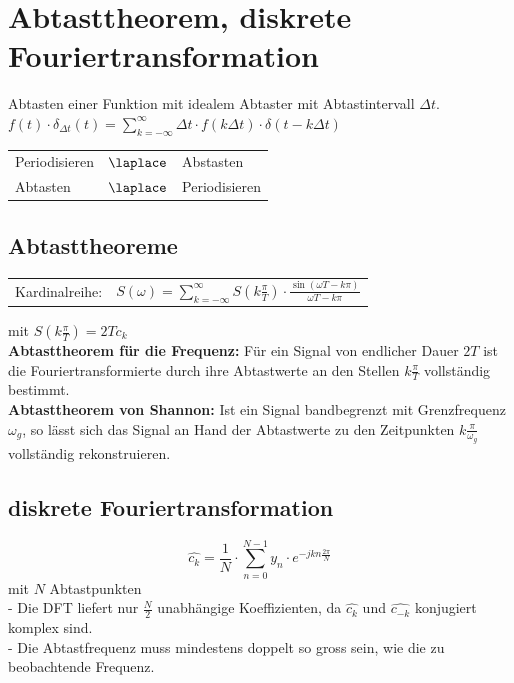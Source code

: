 
\section{Abtasttheorem, diskrete Fouriertransformation}
	\begin{minipage}{12cm}
		Abtasten einer Funktion mit idealem Abtaster mit Abtastintervall $\Delta t$.\\
		$f(t) \cdot \delta_{\Delta t}(t) = \sum\limits_{k=-\infty}^{\infty} \Delta t \cdot f(k \Delta t) \cdot \delta(t-k \Delta t)$
	\end{minipage}
	\begin{minipage}{6cm}
		\begin{tabular}{|l l l|}
			\hline
				Periodisieren &$\laplace$ & Abstasten\\
				Abtasten & $\laplace$ & Periodisieren\\
			\hline
		\end{tabular}
	\end{minipage}

\subsection{Abtasttheoreme}
	\begin{tabular}{ l l }
		Kardinalreihe: & $S(\omega) = \sum\limits_{k=-\infty}^{\infty} S(k\frac{\pi}{T}) \cdot \frac{\sin(\omega T - k\pi)}{\omega T - k\pi}$
	\end{tabular}
	mit $S(k\frac{\pi}{T}) = 2Tc_k$\\
	
	\textbf{Abtasttheorem f\"ur die Frequenz:}
	F\"ur ein Signal von endlicher Dauer $2T$ ist die Fouriertransformierte durch ihre Abtastwerte an den Stellen $k\frac{\pi}{T}$
	vollst\"andig bestimmt. \\
	
	\textbf{Abtasttheorem von Shannon:}
	Ist ein Signal bandbegrenzt mit Grenzfrequenz $\omega_g$, so l\"asst sich das Signal an Hand der Abtastwerte zu den Zeitpunkten
	$k\frac{\pi}{\omega_g}$ vollst\"andig rekonstruieren.
	
	
\subsection{diskrete Fouriertransformation}
	$$\hat{c_k} = \frac{1}{N} \cdot \sum\limits_{n=0}^{N-1} y_n \cdot e^{-jkn\frac{2\pi}{N}}$$
	mit $N$ Abtastpunkten\\
		-	Die DFT liefert nur $\frac{N}{2}$ unabh\"angige Koeffizienten, da $\hat{c_k}$ und $\hat{c_{-k}}$ konjugiert komplex sind.\\
		- Die Abtastfrequenz muss mindestens doppelt so gross sein, wie die zu beobachtende Frequenz.
	
